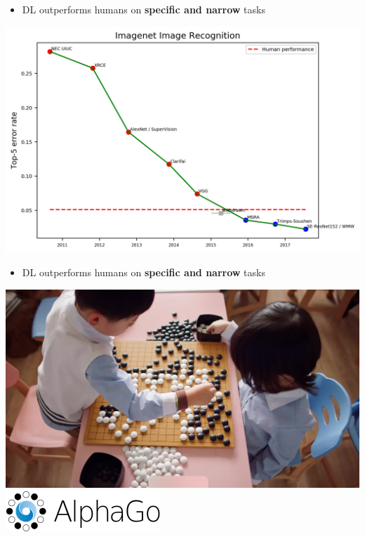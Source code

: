 \documentclass[usenames,dvipsnames]{beamer}
\begin{document}
    \begin{frame}{\secname}
        \begin{itemize}
            \item DL outperforms humans on \textbf{specific and narrow} tasks
        \end{itemize}
        \begin{center}
            \includegraphics[width=\linewidth]{figures/DL_fundamentals/imagenet_perf.png}
        \end{center}
    \end{frame}
    \begin{frame}{\secname}
        \begin{itemize}
            \item DL outperforms humans on \textbf{specific and narrow} tasks
        \end{itemize}
        \begin{center}
            \includegraphics[width=0.75\linewidth]{figures/DL_fundamentals/alphago_ex.png}
            \includegraphics[width=0.2\linewidth]{figures/DL_fundamentals/Alphago_logo.png}
        \end{center}
    \end{frame}
\end{document}
